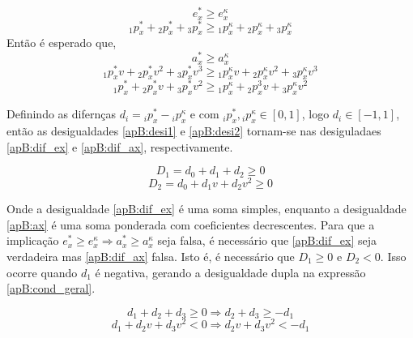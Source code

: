 \begin{equation}
    e^{*}_x \geq e^{\kappa}_{x}
\end{equation}
\begin{equation}
    {}_{1}p^{*}_x + {}_{2}p^{*}_x + {}_{3}p^{*}_x \geq {}_{1}p^{\kappa}_x + {}_{2}p^{\kappa}_x + {}_{3}p^{\kappa}_x
    \label{apB:desi1}
\end{equation}
Então é esperado que,
\begin{equation}
    a^{*}_x \geq a^{\kappa}_{x}
\end{equation}
\begin{equation}
    {}_{1}p^{*}_x v + {}_{2}p^{*}_x v^{2} + {}_{3}p^{*}_x v^{3} \geq {}_{1}p^{\kappa}_x v + {}_{2}p^{\kappa}_x v^{2} + {}_{3}p^{\kappa}_x v^{3}
\end{equation}
\begin{equation}
    {}_{1}p^{*}_x  + {}_{2}p^{*}_x  v + {}_{3}p^{*}_x  v^2 \geq {}_{1}p^{\kappa}_x  + {}_{2}p^{3}_x  v + {}_{3}p^{\kappa}_x  v^2
    \label{apB:desi2}
\end{equation}

Definindo as difernças $d_i = {}_{i}p^{*}_x - {}_{i}p^{\kappa}_x$ e com ${}_{i}p^{*}_x,{}_{i}p^{\kappa}_x \in [0,1]$, logo $d_i \in [-1, 1]$, então as desigualdades \ref{apB:desi1} e \ref{apB:desi2} tornam-se nas desiguladaes \ref{apB:dif_ex} e \ref{apB:dif_ax}, respectivamente.

\begin{equation}
    D_1 = d_0 + d_1 + d_2 \geq 0
    \label{apB:dif_ex}
\end{equation}
\begin{equation}
    D_2 = d_0 + d_1v + d_2v^2 \geq 0
    \label{apB:dif_ax}
\end{equation}

Onde a desigualdade \ref{apB:dif_ex} é uma soma simples, enquanto a desigualdade \ref{apB:ax} é uma soma ponderada com coeficientes decrescentes. Para que a implicação $e^{*}_x \geq e^{\kappa}_x \Rightarrow a^{*}_x \geq a^{\kappa}_x$ seja falsa, é necessário que \ref{apB:dif_ex} seja verdadeira mas \ref{apB:dif_ax} falsa. Isto é, é necessário que $D_1 \geq 0$ e $D_2 < 0$. Isso ocorre quando $d_1$ é negativa, gerando a desigualdade dupla na expressão \ref{apB:cond_geral}.

\begin{equation}
    d_1 + d_2 + d_3 \geq 0 \Rightarrow d_2 + d_3 \geq -d_1
\end{equation}
\begin{equation}
    d_1 + d_2v + d_3v^2 < 0 \Rightarrow d_2v + d_3v^2 < -d_1 
\end{equation}

